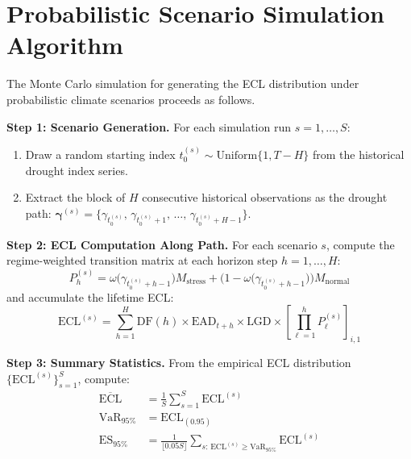 \documentclass[12pt,a4paper]{article}
\newcommand{\Mnormal}{M_{\text{normal}}}
\newcommand{\Mstress}{M_{\text{stress}}}
\begin{document}
\section{Probabilistic Scenario Simulation Algorithm}
\label{app:prob_sim}

The Monte Carlo simulation for generating the ECL distribution under probabilistic climate scenarios proceeds as follows.

\textbf{Step 1: Scenario Generation.} For each simulation run $s = 1, \ldots, S$:
\begin{enumerate}[noitemsep]
    \item Draw a random starting index $t_0^{(s)} \sim \text{Uniform}\{1, T - H\}$ from the historical drought index series.
    \item Extract the block of $H$ consecutive historical observations as the drought path: $\boldsymbol{\gamma}^{(s)} = \{\gamma_{t_0^{(s)}},\, \gamma_{t_0^{(s)}+1},\, \ldots,\, \gamma_{t_0^{(s)}+H-1}\}$.
\end{enumerate}

\textbf{Step 2: ECL Computation Along Path.} For each scenario $s$, compute the regime-weighted transition matrix at each horizon step $h = 1, \ldots, H$:
\begin{equation}
P_h^{(s)} = \omega\bigl(\gamma_{t_0^{(s)}+h-1}\bigr) \Mstress + \bigl(1 - \omega\bigl(\gamma_{t_0^{(s)}+h-1}\bigr)\bigr) \Mnormal
\end{equation}
and accumulate the lifetime ECL:
\begin{equation}
\text{ECL}^{(s)} = \sum_{h=1}^{H} \text{DF}(h) \times \text{EAD}_{t+h} \times \text{LGD} \times \left[\prod_{\ell=1}^{h} P_{\ell}^{(s)}\right]_{i,1}
\end{equation}

\textbf{Step 3: Summary Statistics.} From the empirical ECL distribution $\{\text{ECL}^{(s)}\}_{s=1}^{S}$, compute:
\begin{align}
\overline{\text{ECL}} &= \frac{1}{S} \sum_{s=1}^{S} \text{ECL}^{(s)} \\
\text{VaR}_{95\%} &= \text{ECL}_{(0.95)} \\
\text{ES}_{95\%} &= \frac{1}{\lfloor 0.05 S \rfloor} \sum_{s:\, \text{ECL}^{(s)} \geq \text{VaR}_{95\%}} \text{ECL}^{(s)}
\end{align}

\end{document}
